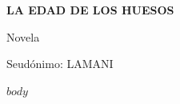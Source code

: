 \documentclass[12pt,oneside]{book}
\begin{document}
\thispagestyle{empty}
\begin{center}
\vspace*{6cm}
{\Large\bfseries LA EDAD DE LOS HUESOS\par}
\vspace{3cm}
{\large Novela\par}
\vspace{3cm}
{\large Seudónimo: LAMANI\par}
\end{center}
\clearpage

\setcounter{page}{1}

$body$
\end{document}
